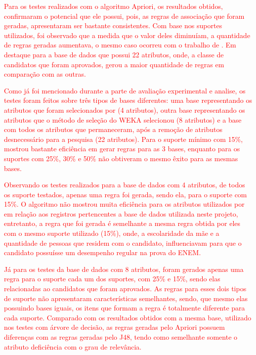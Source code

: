 \par
\textcolor{red}{Para os testes realizados com o algoritmo Apriori, os resultados obtidos, confirmaram o potencial que ele possui, pois, as regras de associação que foram geradas, apresentaram ser bastante consistentes. Com base nos suportes utilizados, foi observado que a medida que o valor deles diminuíam, a quantidade de regras geradas aumentava, o mesmo caso ocorreu com o trabalho de . Em destaque para a base de dados que possui 22 atributos, onde, a classe de candidatos que foram aprovados, gerou a maior quantidade de regras em comparação com as outras.}

\par
\textcolor{red}{Como já foi mencionado durante a parte de avaliação experimental e analise, os testes foram feitos sobre três tipos de bases diferentes: uma base representando os atributos que foram selecionados por  (4 atributos), outra base representando os atributos que o método de seleção do WEKA selecionou (8 atributos) e a base com todos os atributos que permaneceram, após a remoção de atributos desnecessário para a pesquisa (22 atributos). Para o suporte mínimo com 15\%, mostrou bastante eficiência em gerar regras para as 3 bases, enquanto para os suportes com 25\%, 30\% e 50\% não obtiveram o mesmo êxito para as mesmas bases.}

\par
\textcolor{red}{Observando os testes realizados para a base de dados com 4 atributos, de todos os suporte testados, apenas uma regra foi gerada, sendo ela, para o suporte com 15\%. O algoritmo não mostrou muita eficiência para os atributos utilizados por  em relação  aos registros pertencentes a base de dados utilizada neste projeto, entretanto, a regra que foi gerada é semelhante a mesma regra obtida por eles com o mesmo suporte utilizado (15\%), onde, a escolaridade da mãe e a quantidade de pessoas que residem com o candidato, influenciavam para que o candidato possuísse um desempenho regular na prova do ENEM.}

\par
\textcolor{red}{Já para os testes da base de dados com 8 atributos, foram gerados apenas uma regra para o suporte cada um dos suportes, com 25\% e 15\%, sendo elas relacionadas ao candidatos que foram aprovados. As regras para esses dois tipos de suporte não apresentaram características semelhantes, sendo, que mesmo elas possuindo bases iguais, os itens que formam a regra é totalmente diferente para cada suporte. Comparado com os resultados obtidos com a mesma base, utilizado nos testes com árvore de decisão, as regras geradas pelo Apriori possuem diferenças com as regras geradas pelo J48, tendo como semelhante somente o atributo deficiência com o grau de relevância.}

